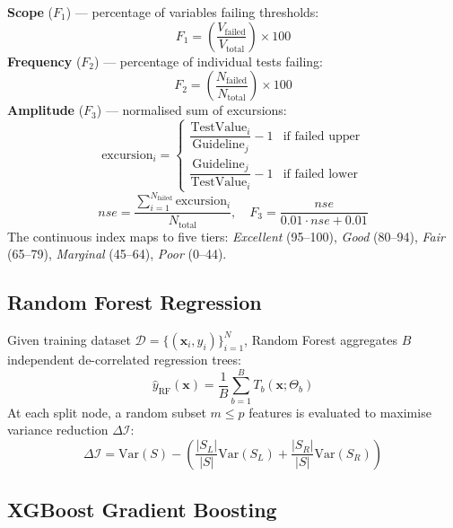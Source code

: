 \documentclass[conference]{IEEEtran}
\begin{document}
\noindent\textbf{Scope} ($F_1$) --- percentage of variables failing thresholds:
\begin{equation}
  F_1 = \left(\frac{V_{\text{failed}}}{V_{\text{total}}}\right) \times 100
\end{equation}
\noindent\textbf{Frequency} ($F_2$) --- percentage of individual tests failing:
\begin{equation}
  F_2 = \left(\frac{N_{\text{failed}}}{N_{\text{total}}}\right) \times 100
\end{equation}
\noindent\textbf{Amplitude} ($F_3$) --- normalised sum of excursions:
\begin{equation}
  \text{excursion}_i =
    \begin{cases}
      \dfrac{\text{TestValue}_i}{\text{Guideline}_j} - 1
        & \text{if failed upper}\\[6pt]
      \dfrac{\text{Guideline}_j}{\text{TestValue}_i} - 1
        & \text{if failed lower}
    \end{cases}
\end{equation}
\begin{equation}
  nse = \frac{\sum_{i=1}^{N_{\text{failed}}} \text{excursion}_i}{N_{\text{total}}},
  \quad
  F_3 = \frac{nse}{0.01 \cdot nse + 0.01}
\end{equation}
The continuous index maps to five tiers: \emph{Excellent} (95--100),
\emph{Good} (80--94), \emph{Fair} (65--79), \emph{Marginal} (45--64),
\emph{Poor} (0--44).

\subsection{Random Forest Regression}

Given training dataset $\mathcal{D} = \{(\mathbf{x}_i, y_i)\}_{i=1}^N$,
Random Forest aggregates $B$ independent de-correlated regression trees:
\begin{equation}
  \hat{y}_{\text{RF}}(\mathbf{x}) =
    \frac{1}{B}\sum_{b=1}^B T_b\!\left(\mathbf{x};\Theta_b\right)
\end{equation}
At each split node, a random subset $m \le p$ features is evaluated to
maximise variance reduction $\Delta\mathcal{I}$:
\begin{equation}
  \Delta\mathcal{I} = \mathrm{Var}(S) -
    \left(\frac{|S_L|}{|S|}\mathrm{Var}(S_L) +
          \frac{|S_R|}{|S|}\mathrm{Var}(S_R)\right)
\end{equation}

\subsection{XGBoost Gradient Boosting}
\end{document}
